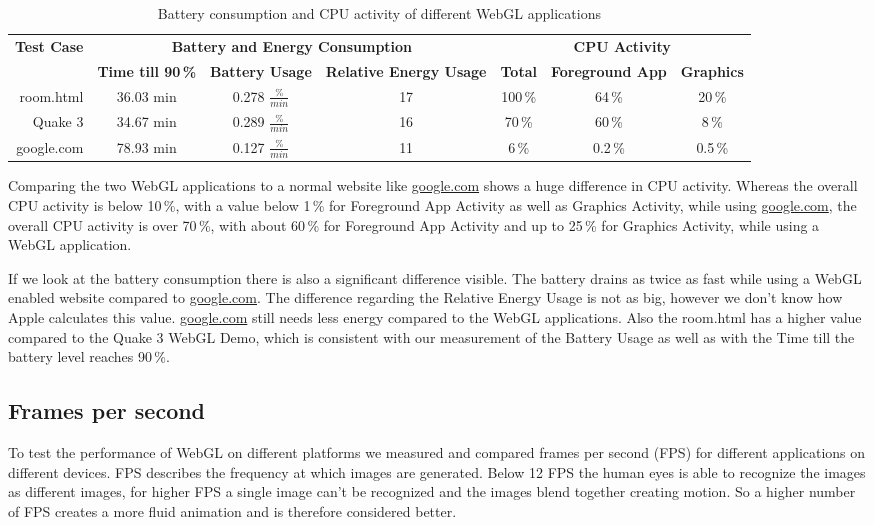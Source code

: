 \documentclass[12pt,journal,compsoc]{IEEEtran}
\begin{document}
\begin{table*}[tb]
	\begin{centering}
	\begin{tabular}{r|c|c|c|c|c|c}
		\multirow{2}{*}{\textbf{Test Case}} & \multicolumn{3}{c|}{\textbf{Battery and Energy Consumption}}						 & \multicolumn{3}{c}{\textbf{CPU Activity}}					\\
 							&\textbf{Time till 90\,\%} & \textbf{Battery Usage}	& \textbf{Relative Energy Usage} & \textbf{Total} 	& \textbf{Foreground App} 		& \textbf{Graphics}	\\
		\hline
		room.html		   &	36.03 min				& 0.278 $\frac{\%}{min}$	&	17							& 100\,\%			& 64\,\%						& 20\,\%			\\
		Quake 3			   &	34.67 min				& 0.289 $\frac{\%}{min}$	&	16							& 70\,\%			& 60\,\%						& 8\,\%			\\
		google.com		   &	78.93 min				& 0.127	$\frac{\%}{min}$	&	11							& 6\,\%				& 0.2\,\%						& 0.5\,\%		\\
	\end{tabular}
	\caption{Battery consumption and CPU activity of different WebGL applications\label{batteryTable}}
	\end{centering}
\end{table*}

Comparing the two WebGL applications to a normal website like \url{google.com} shows a huge difference in CPU activity. Whereas the overall CPU activity is below 10\,\%, with a value below 1\,\% for Foreground App Activity as well as Graphics Activity, while using \url{google.com}, the overall CPU activity is over 70\,\%, with about 60\,\% for Foreground App Activity and up to 25\,\% for Graphics Activity, while using a WebGL application. 

If we look at the battery consumption there is also a significant difference visible. The battery drains as twice as fast while using a WebGL enabled website compared to \url{google.com}. The difference regarding the Relative Energy Usage is not as big, however we don't know how Apple calculates this value. \url{google.com} still needs less energy compared to the WebGL applications. Also the room.html has a higher value compared to the Quake 3 WebGL Demo, which is consistent with our measurement of the Battery Usage as well as with the Time till the battery level reaches 90\,\%.

\subsection{Frames per second}
To test the performance of WebGL on different platforms we measured and compared frames per second (FPS) for different applications on different devices. FPS describes the frequency at which images are generated. Below 12 FPS the human eyes is able to recognize the images as different images, for higher FPS a single image can’t be recognized and the images blend together creating motion. So a higher number of FPS creates a more fluid animation and is therefore considered better.
\end{document}
